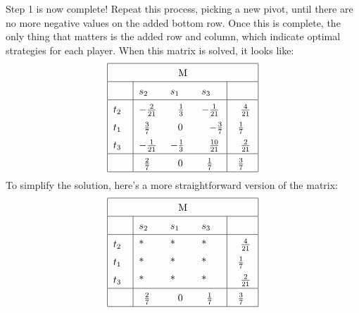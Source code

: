 \documentclass[11pt]{article}
\begin{document}
Step 1 is now complete! Repeat this process, picking a new pivot, until
there are no more negative values on the added bottom row. Once this is
complete, the only thing that matters is the added row and column,
which indicate optimal strategies for each player. When this matrix is
solved, it looks like:
\begin{equation*}
\renewcommand{\arraystretch}{1.5}
\begin{tabular}{ |p{0.5cm}|p{0.7cm} p{0.7cm} p{0.7cm}|p{0.7cm}| }
\hline
\multicolumn{5}{|c|}{M} \\
\hline
$\textcolor{white}{-}$ & $s_2$ & $s_1$ & $s_3$ & $\textcolor{white}{-}$\\
\hline
$t_2$ & $-\frac{2}{21}$ & $\textcolor{white}{-}$$\frac{1}{3}$ & $-\frac{1}{21}$ & $\textcolor{white}{-}$$\frac{4}{21}$\\
$t_1$ & \textcolor{white}{--}$\frac{3}{7}$ & $\textcolor{white}{-}$0 & $\textcolor{white}{-}$$-\frac{3}{7}$ & \textcolor{white}{--}$\frac{1}{7}$\\
$t_3$ & $-\frac{1}{21}$ & $-\frac{1}{3}$ & $\textcolor{white}{-}$$\frac{10}{21}$ & $\textcolor{white}{-}$$\frac{2}{21}$\\
\hline
$\textcolor{white}{-}$ & \textcolor{white}{--}$\frac{2}{7}$ & $\textcolor{white}{-}$0 & \textcolor{white}{--}$\frac{1}{7}$ & \textcolor{white}{--}$\frac{3}{7}$\\
\hline
\end{tabular}
\end{equation*}
To simplify the solution, here's a more straightforward version of the
matrix:
\begin{equation*}
\renewcommand{\arraystretch}{1.5}
\begin{tabular}{ |p{0.5cm}|p{0.7cm} p{0.7cm} p{0.7cm}|p{0.7cm}| }
\hline
\multicolumn{5}{|c|}{M} \\
\hline
$\textcolor{white}{-}$ & $s_2$ & $s_1$ & $s_3$ & $\textcolor{white}{-}$\\
\hline
$t_2$ & * & * & * & $\textcolor{white}{-}$$\frac{4}{21}$\\
$t_1$ & * & * & * & \textcolor{white}{--}$\frac{1}{7}$\\
$t_3$ & * & * & * & $\textcolor{white}{-}$$\frac{2}{21}$\\
\hline
$\textcolor{white}{-}$ & \textcolor{white}{--}$\frac{2}{7}$ & $\textcolor{white}{-}$0 & \textcolor{white}{--}$\frac{1}{7}$ & \textcolor{white}{--}$\frac{3}{7}$\\
\hline
\end{tabular}
\end{equation*}
\end{document}
